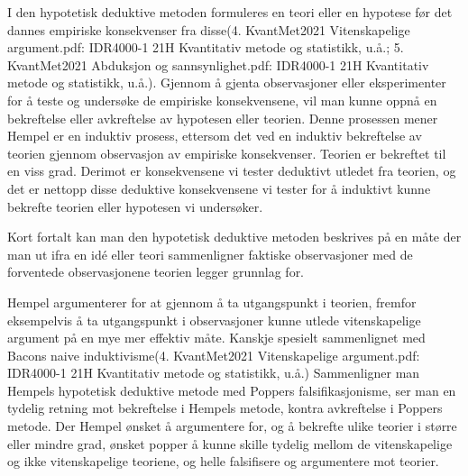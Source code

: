 \documentclass[
]{book}
\begin{document}
I den hypotetisk deduktive metoden formuleres en teori eller en hypotese før det dannes empiriske konsekvenser fra disse(4. KvantMet2021 Vitenskapelige argument.pdf: IDR4000-1 21H Kvantitativ metode og statistikk, u.å.; 5. KvantMet2021 Abduksjon og sannsynlighet.pdf: IDR4000-1 21H Kvantitativ metode og statistikk, u.å.). Gjennom å gjenta observasjoner eller eksperimenter for å teste og undersøke de empiriske konsekvensene, vil man kunne oppnå en bekreftelse eller avkreftelse av hypotesen eller teorien\citep{hempel1966}. Denne prosessen mener Hempel er en induktiv prosess, ettersom det ved en induktiv bekreftelse av teorien gjennom observasjon av empiriske konsekvenser. Teorien er bekreftet til en viss grad. Derimot er konsekvensene vi tester deduktivt utledet fra teorien, og det er nettopp disse deduktive konsekvensene vi tester for å induktivt kunne bekrefte teorien eller hypotesen vi undersøker.

Kort fortalt kan man den hypotetisk deduktive metoden beskrives på en måte der man ut ifra en idé eller teori sammenligner faktiske observasjoner med de forventede observasjonene teorien legger grunnlag for.

Hempel argumenterer for at gjennom å ta utgangspunkt i teorien, fremfor eksempelvis å ta utgangspunkt i observasjoner kunne utlede vitenskapelige argument på en mye mer effektiv måte\citep{hempel1966}. Kanskje spesielt sammenlignet med Bacons naive induktivisme(4. KvantMet2021 Vitenskapelige argument.pdf: IDR4000-1 21H Kvantitativ metode og statistikk, u.å.) Sammenligner man Hempels hypotetisk deduktive metode med Poppers falsifikasjonisme, ser man en tydelig retning mot bekreftelse i Hempels metode, kontra avkreftelse i Poppers metode\citep{hempel1966, popper2002}. Der Hempel ønsket å argumentere for, og å bekrefte ulike teorier i større eller mindre grad, ønsket popper å kunne skille tydelig mellom de vitenskapelige og ikke vitenskapelige teoriene, og helle falsifisere og argumentere mot teorier.
\end{document}
